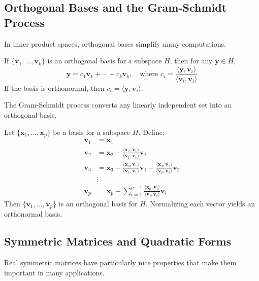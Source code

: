 \subsection{Orthogonal Bases and the Gram-Schmidt Process}

In inner product spaces, orthogonal bases simplify many computations.

\begin{theorem}
If $\{\mathbf{v}_1, \ldots, \mathbf{v}_k\}$ is an orthogonal basis for a subspace $H$, then for any $\mathbf{y} \in H$,
\[
\mathbf{y} = c_1 \mathbf{v}_1 + \cdots + c_k \mathbf{v}_k, \quad \text{where } c_i = \frac{\langle \mathbf{y}, \mathbf{v}_i \rangle}{\langle \mathbf{v}_i, \mathbf{v}_i \rangle}
\]
If the basis is orthonormal, then $c_i = \langle \mathbf{y}, \mathbf{v}_i \rangle$.
\end{theorem}

The Gram-Schmidt process converts any linearly independent set into an orthogonal basis.

\begin{theorem}
Let $\{\mathbf{x}_1, \ldots, \mathbf{x}_p\}$ be a basis for a subspace $H$. Define:
\begin{align*}
\mathbf{v}_1 &= \mathbf{x}_1 \\
\mathbf{v}_2 &= \mathbf{x}_2 - \frac{\langle \mathbf{x}_2, \mathbf{v}_1 \rangle}{\langle \mathbf{v}_1, \mathbf{v}_1 \rangle} \mathbf{v}_1 \\
\mathbf{v}_3 &= \mathbf{x}_3 - \frac{\langle \mathbf{x}_3, \mathbf{v}_1 \rangle}{\langle \mathbf{v}_1, \mathbf{v}_1 \rangle} \mathbf{v}_1 - \frac{\langle \mathbf{x}_3, \mathbf{v}_2 \rangle}{\langle \mathbf{v}_2, \mathbf{v}_2 \rangle} \mathbf{v}_2 \\
&\vdots \\
\mathbf{v}_p &= \mathbf{x}_p - \sum_{i=1}^{p-1} \frac{\langle \mathbf{x}_p, \mathbf{v}_i \rangle}{\langle \mathbf{v}_i, \mathbf{v}_i \rangle} \mathbf{v}_i
\end{align*}
Then $\{\mathbf{v}_1, \ldots, \mathbf{v}_p\}$ is an orthogonal basis for $H$. Normalizing each vector yields an orthonormal basis.
\end{theorem}

\subsection{Symmetric Matrices and Quadratic Forms}

Real symmetric matrices have particularly nice properties that make them important in many applications.

